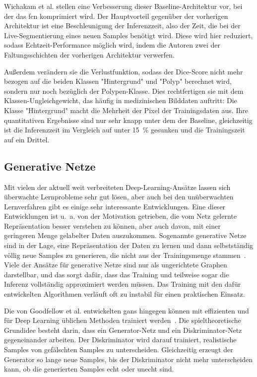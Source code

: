 Wichakam et al. \cite{Wichakam.2018} stellen eine Verbesserung dieser Baseline-Architektur vor, bei der das \gls{fcn} komprimiert wird.
Der Hauptvorteil gegenüber der vorherigen Architektur ist eine Beschleunigung der Inferenzzeit, also der Zeit, die bei der Live-Segmentierung eines neuen Samples benötigt wird.
Diese wird hier reduziert, sodass Echtzeit-Performance möglich wird, indem die Autoren zwei der Faltungsschichten der vorherigen Architektur verwerfen.

Außerdem verändern sie die Verlustfunktion, sodass der Dice-Score nicht mehr bezogen auf die beiden Klassen "Hintergrund" und "Polyp" berechnet wird, sondern nur noch bezüglich der Polypen-Klasse.
Dies rechtfertigen sie mit dem Klassen-Ungleichgewicht, das häufig in medizinischen Bilddaten auftritt:
Die Klasse "Hintergrund" macht die Mehrheit der Pixel der Trainingsdaten aus.
Ihre quantitativen Ergebnisse sind nur sehr knapp unter dem der Baseline, gleichzeitig ist die Inferenzzeit im Vergleich auf unter 15~\% gesunken und die Trainingszeit auf ein Drittel.

\subsection{Generative Netze}

Mit vielen der aktuell weit verbreiteten Deep-Learning-Ansätze lassen sich überwachte Lernprobleme sehr gut lösen, aber auch bei den unüberwachten Lernverfahren gibt es einige sehr interessante Entwicklungen.
Eine dieser Entwicklungen ist u.~a. von der Motivation getrieben, die vom Netz gelernte Repräsentation besser verstehen zu können, aber auch davon, mit einer geringeren Menge gelabelter Daten auszukommen.
Sogenannte generative Netze sind in der Lage, eine Repräsentation der Daten zu lernen und dann selbstständig völlig neue Samples zu generieren, die nicht aus der Trainingsmenge stammen~\cite{Goodfellow.2016}.
Viele der Ansätze für generative Netze sind nur als ungerichtete Graphen darstellbar, und das sorgt dafür, dass das Training und teilweise sogar die Inferenz vollständig approximiert werden müssen.
Das Training mit den dafür entwickelten Algorithmen verläuft oft zu instabil für einen praktischen Einsatz.

Die von Goodfellow et al. entwickelten \glspl{gan} hingegen können mit effizienten und für Deep Learning üblichen Methoden trainiert werden~\cite{Goodfellow.2014}.
Die spieltheoretische Grundidee besteht darin, dass ein Generator-Netz und ein Diskriminator-Netz gegeneinander arbeiten.
Der Diskriminator wird darauf trainiert, realistische Samples von gefälschten Samples zu unterscheiden.
Gleichzeitig erzeugt der Generator so lange neue Samples, bis der Diskriminator nicht mehr unterscheiden kann, ob die generierten Samples echt oder unecht sind.

